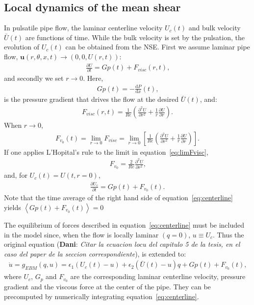 \documentclass{article}
\DeclareRobustCommand{\dm}[1]{{\color{blue}(\textbf{Dani}: \textit{#1}\xspace)}}
\begin{document}
\subsection{Local dynamics of the mean shear}
In pulsatile pipe flow, the laminar centerline velocity $U_{c} \left(t \right)$ and bulk velocity $\bar{U} \left( t \right)$ are functions of time. While the bulk velocity is set by the pulsation, the evolution of $U_{c}\left( t \right)$ can be obtained from the NSE. First we assume laminar pipe flow, $\pmb{u}\left(r,\theta,x,t\right)\rightarrow\left(0,0,U\left(r,t\right) \right)$:
\begin{align}
\frac{\partial U}{\partial t}= Gp\left(t\right) + F_{visc}\left(r,t\right) \text{,}
\end{align}
and secondly we set $r \rightarrow 0$. Here,
\begin{align}
Gp\left(t\right)=- \frac{\mathrm{d} P}{\mathrm{d} x} \left(t \right) \text{,}
\end{align}
is the pressure gradient that drives the flow at the desired $\bar{U} \left( t \right)$, and:
\begin{align}
F_{visc}\left(r,t\right)= \frac{1}{Re} \left( \frac{\partial^{2}U}{\partial r^{2}} + \frac{1}{r} \frac{\partial U}{\partial r} \right) \text{.}
\end{align}
When $r \rightarrow 0$,
\begin{align}
F_{v_{0}} \left(t \right)=\lim_{r \to 0} F_{visc} = \lim_{r \to 0} \left[ \frac{1}{Re} \left( \frac{\partial^{2}U}{\partial r^{2}} + \frac{1}{r} \frac{\partial U}{\partial r} \right) \right] \text{.}
\label{eq:limFvisc}
\end{align}
If one applies L'Hopital's rule to the limit in equation~\ref{eq:limFvisc},
\begin{align}
F_{v_{0}} =  \frac{2}{Re} \frac{\partial^{2}U}{\partial r^{2}} \text{,}
\end{align}
and, for $U_{c}\left(t\right)=U\left(t,r=0\right)$,
\begin{align}
\frac{\partial U_{c}}{\partial t}=Gp\left(t\right) + F_{v_{0}}\left(t\right) \text{.}
\label{eq:centerline}
\end{align}
Note that the time average of the right hand side of equation~\ref{eq:centerline} yields $\left \langle Gp\left(t\right) + F_{v_{0}}\left(t\right) \right \rangle=0$

The equilibrium of forces described in equation~\ref{eq:centerline} must be included in the model since, when the flow is locally laminar $\left(q=0\right)$, $u\equiv U_{c}$. Thus the original equation \dm{Citar la ecuacion locu del capitulo 5 de la tesis, en el caso del paper de la seccion correspondiente}, is extended to:
\begin{align}
\dot{u}=g_{EBM}\left(q,u\right)= \epsilon_{1} \left(U_{c}\left(t\right)-u \right) + \epsilon_{2} \left(\bar{U}\left(t\right)-u \right)q + Gp\left(t\right) + F_{v_{0}}\left(t\right) \text{,}
\label{eq:loc_u_EBM}
\end{align}
where $U_{c}$, $G_{p}$ and $F_{v_{0}}$ are the corresponding laminar centerline velocity, pressure gradient and the viscous force at the center of the pipe. They can be precomputed by numerically integrating equation~\ref{eq:centerline}.
\end{document}
